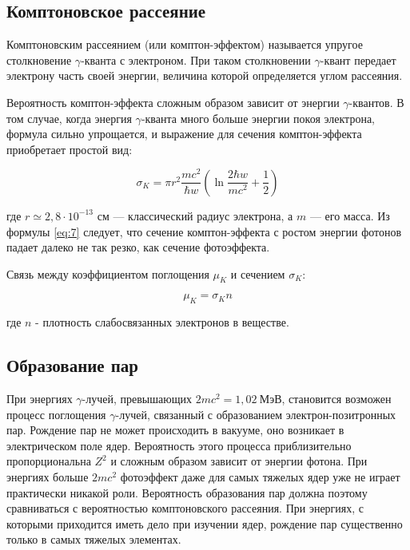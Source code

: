 \documentclass[a4paper,12pt]{article}
\begin{document}
\subsection*{Комптоновское рассеяние}

Комптоновским рассеянием (или комптон-эффектом) называется упругое столкновение $\gamma$-кванта с электроном. При таком столкновении $\gamma$-квант передает электрону часть своей энергии, величина которой определяется углом рассеяния.

Вероятность комптон-эффекта сложным образом зависит от энергии $\gamma$-квантов. В том случае, когда энергия $\gamma$-кванта много больше энергии покоя электрона, формула сильно упрощается, и выражение для сечения комптон-эффекта приобретает простой вид:

\begin{equation}\label{eq:7}
    \sigma_K = \pi r^2 \frac{mc^2}{\hbar w} \left( \ln {\frac{2 \hbar w}{mc^2}} + \frac{1}{2} \right)
\end{equation}

где $r \simeq 2{,}8 \cdot 10^{-13}$ см — классический радиус электрона, а $m$ — его масса. Из формулы \eqref{eq:7} следует, что сечение комптон-эффекта с ростом энергии фотонов падает далеко не так резко, как сечение фотоэффекта. 

Связь между коэффициентом поглощения $\mu_K$ и сечением $\sigma_K$:

\begin{equation*}
    \mu_K = \sigma_Kn
\end{equation*}

где $n$ - плотность слабосвязанных электронов в веществе.

\subsection*{Образование пар}

При энергиях $\gamma$-лучей, превышающих $2mc^2 = 1{,}02 \ \text{МэВ}$, становится возможен процесс поглощения $\gamma$-лучей, связанный с образованием электрон-позитронных пар. Рождение пар не может происходить в вакууме, оно возникает в электрическом поле ядер. Вероятность этого процесса приблизительно пропорциональна $Z^2$ и сложным образом зависит от энергии фотона. При энергиях больше $2mc^2$ фотоэффект даже для самых тяжелых ядер уже не играет практически никакой роли. Вероятность образования пар должна поэтому сравниваться с вероятностью комптоновского рассеяния. При энергиях, с которыми приходится иметь дело при изучении ядер, рождение пар существенно только в самых тяжелых элементах.
\end{document}

